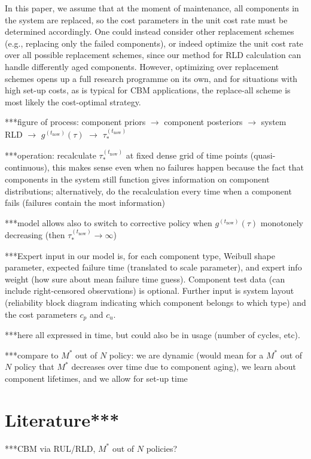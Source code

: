 \documentclass[authoryear]{elsarticle}
\def\tnow{t_\text{now}}
\newcommand{\gnow}{g^{(\tnow)}}
\newcommand{\tausnow}{\tau_*^{(\tnow)}}
\begin{document}
In this paper, we assume that at the moment of maintenance,
all components in the system are replaced,
so the cost parameters in the unit cost rate must be determined accordingly.
One could instead consider other replacement schemes (e.g., replacing only the failed components),
or indeed optimize the unit cost rate over all possible replacement schemes,
since our method for RLD calculation can handle differently aged components. 
However, optimizing over replacement schemes opens up a full research programme on its own,
and for situations with high set-up costs,
as is typical for CBM applications,
the replace-all scheme is most likely the cost-optimal strategy. 


***figure of process: component priors $\to$ component posteriors $\to$ system RLD $\to$ $\gnow(\tau)$ $\to$ $\tausnow$

***operation: recalculate $\tausnow$ at fixed dense grid of time points (quasi-continuous),
this makes sense even when no failures happen because the fact that components in the system still function
gives information on component distributions;
alternatively, do the recalculation every time when a component fails (failures contain the most information)

***model allows also to switch to corrective policy when $\gnow(\tau)$ monotonely decreasing (then $\tausnow \to \infty$)

***Expert input in our model is, for each component type,
Weibull shape parameter, expected failure time (translated to scale parameter),
and expert info weight (how sure about mean failure time guess).
Component test data (can include right-censored observations) is optional.
Further input is system layout (reliability block diagram indicating which component belongs to which type)
and the cost parameters $c_p$ and $c_u$.

***here all expressed in time, but could also be in usage (number of cycles, etc).

***compare to $M^*$ out of $N$ policy:
we are dynamic (would mean for a $M^*$ out of $N$ policy that $M^*$ decreases over time due to component aging),
we learn about component lifetimes,
and we allow for set-up time



\section{Literature***}

***CBM via RUL/RLD, $M^*$ out of $N$ policies?
\end{document}
